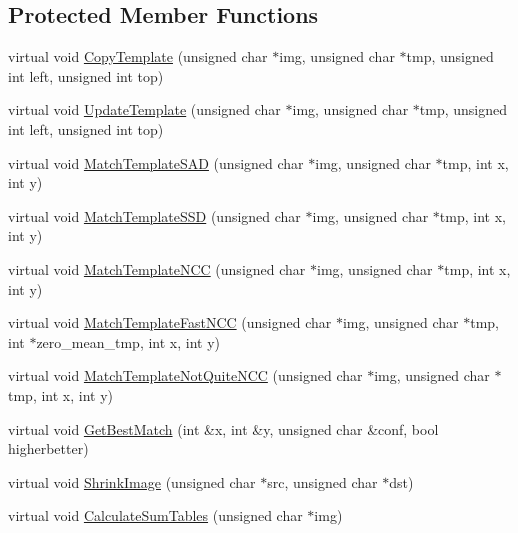 \subsection*{Protected Member Functions}
\begin{DoxyCompactItemize}
\item 
virtual void \hyperlink{classsvl_tracker_m_s_brute_force_a568ffd62a1cdb2dee5d9b01b18a3239c}{Copy\-Template} (unsigned char $\ast$img, unsigned char $\ast$tmp, unsigned int left, unsigned int top)
\item 
virtual void \hyperlink{classsvl_tracker_m_s_brute_force_a4f7c44fcffa6dac28582e491bcd51721}{Update\-Template} (unsigned char $\ast$img, unsigned char $\ast$tmp, unsigned int left, unsigned int top)
\item 
virtual void \hyperlink{classsvl_tracker_m_s_brute_force_a5d11bf81ef35a192ab295a3f6cdfd35b}{Match\-Template\-S\-A\-D} (unsigned char $\ast$img, unsigned char $\ast$tmp, int x, int y)
\item 
virtual void \hyperlink{classsvl_tracker_m_s_brute_force_ac5ed82af34b9f4a85e8783440702fd99}{Match\-Template\-S\-S\-D} (unsigned char $\ast$img, unsigned char $\ast$tmp, int x, int y)
\item 
virtual void \hyperlink{classsvl_tracker_m_s_brute_force_a3c20efe2410727b7f801ed6d65ad5564}{Match\-Template\-N\-C\-C} (unsigned char $\ast$img, unsigned char $\ast$tmp, int x, int y)
\item 
virtual void \hyperlink{classsvl_tracker_m_s_brute_force_afa3edfa4b1064d29cfc53e06647daef1}{Match\-Template\-Fast\-N\-C\-C} (unsigned char $\ast$img, unsigned char $\ast$tmp, int $\ast$zero\-\_\-mean\-\_\-tmp, int x, int y)
\item 
virtual void \hyperlink{classsvl_tracker_m_s_brute_force_aafd758fa73baf5bd711d0e7b64c2826d}{Match\-Template\-Not\-Quite\-N\-C\-C} (unsigned char $\ast$img, unsigned char $\ast$tmp, int x, int y)
\item 
virtual void \hyperlink{classsvl_tracker_m_s_brute_force_a0439000516a913671b157791aa66986f}{Get\-Best\-Match} (int \&x, int \&y, unsigned char \&conf, bool higherbetter)
\item 
virtual void \hyperlink{classsvl_tracker_m_s_brute_force_a545b573c0cb4dde41496e276427be31d}{Shrink\-Image} (unsigned char $\ast$src, unsigned char $\ast$dst)
\item 
virtual void \hyperlink{classsvl_tracker_m_s_brute_force_afb011bf86f256029c09d947a9d05c930}{Calculate\-Sum\-Tables} (unsigned char $\ast$img)
\end{DoxyCompactItemize}
